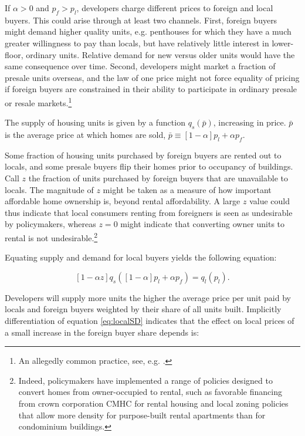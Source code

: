\documentclass[12pt]{article}
\begin{document}
If $\alpha>0$ and $p_{f}>p_{l}$, developers charge different prices to foreign
and local buyers. This could arise through at least two channels. First, foreign buyers
might demand higher quality units, e.g. penthouses for which they have a much
greater willingness to pay than locals, but have relatively little interest in
lower-floor, ordinary units. Relative demand for new versus older units would
have the same consequence over time. Second, developers might market a fraction
of presale units overseas, and the law of one price might not force equality of
pricing if foreign buyers are constrained in their ability to participate in
ordinary presale or resale markets.\footnote{An allegedly common practice, see,
e.g.  \textcite{citynews2017overseasbuyers}.}

The supply of housing units is given by a function $q_{s}\left(\bar{p}\right)$,
increasing in price. $\bar{p}$ is the average price at which homes are sold,
$\bar{p} \equiv \left[1-\alpha\right]p_{l} + \alpha p_{f}$.

Some fraction of housing units purchased by foreign buyers are rented out to
locals, and some presale buyers flip their homes prior to occupancy of
buildings. Call $z$ the fraction of units purchased by foreign buyers that are
unavailable to locals. The magnitude of $z$ might be
taken as a measure of how important affordable home ownership is, beyond rental
affordability. A large $z$ value could thus indicate that local consumers
renting from foreigners is seen as undesirable by policymakers, whereas $z=0$
might indicate that converting owner units to rental is not
undesirable.\footnote{Indeed, policymakers have implemented a range of policies
	designed to convert homes from owner-occupied to rental, such as
	favorable financing from crown corporation CMHC for rental housing and
local zoning policies that allow more density for purpose-built rental
apartments than for condominium buildings.}

Equating supply and demand for local buyers yields the following equation:

\begin{equation}
	\label{eq:localSD}
	\left[1-\alpha z\right]q_{s}\left(\left[1-\alpha\right]p_{l} + \alpha p_{f}\right) = q_{l}(p_{l}).
\end{equation}

Developers will supply more units the higher the average price per unit paid by locals and foreign buyers weighted by their share of all units built. Implicitly differentiation of equation \eqref{eq:localSD} indicates that the effect on local prices of a small increase in the foreign buyer share depends is:
\end{document}
